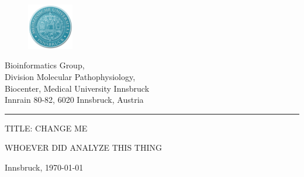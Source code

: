 \documentclass[a4paper,10pt,american]{report}
\begin{document}
\begin{titlepage}

 \begin{center}
   \parbox[t]{9cm}{
     \begin{figure}
        \includegraphics[width=2cm]{./images/MUIlogo-2.png}
      \end{figure}
      \parbox[t]{7.8cm}{
      \vspace{0.4cm}
      \raggedright
      \normalsize
      Bioinformatics Group,\\
      Division Molecular Pathophysiology,\\
      Biocenter, Medical University Innsbruck\\
      Innrain 80-82, 6020 Innsbruck, Austria\\
      \noindent\rule[1ex]{\linewidth}{1pt}
      }
    }
  \end{center}
\vspace{6.5cm}
    \begin{center}
     \Large
     TITLE: CHANGE ME
    \end{center}

\vspace{1.5cm}
    \begin{center}
     \large

     WHOEVER DID ANALYZE THIS THING
    \end{center}

\vspace{6.5cm}
   \vfill
   \begin{center}
     \normalsize
     Innsbruck, \today \\
   \end{center}
\end{titlepage}



\pagebreak

  \pagebreak


  \setcounter{secnumdepth}{0}

  \setcounter{secnumdepth}{3}


  \setcounter{page}{1}







\end{document}
